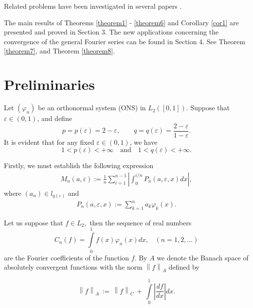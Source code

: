 \documentclass{publmathdeb}
\begin{document}
	Related problems have been investigated in several papers  
	\cite{Cagareishvili, GogoladzeTsagareishvili2, GogoladzeTsagareishvili13, GogoladzeTsagareishvili1, GogoladzeTsagareishvili, GogoladzeTsagareishvili3, PTT, PTW, PTW1, PSTW, tep1, tep2, tep4, Tsagareishvili01, Tsagareishvili2, Tsagareishvili4, Tsagareishvili5, tsatut1, tsatut3}.
	
	The main results of Theorems  \ref{theorem1} - \ref{theorem6} and Corollary \ref{cor1} are presented and proved in Section 3. The new applications concerning the convergence of the general Fourier series can be found in Section 4. See Theorem \ref{theorem7}, and Theorem \ref{theorem8}.
	
	
	
	\section{Preliminaries}
	\vspace{-6pt}
	
	Let \( (\varphi_n) \) be an orthonormal system (ONS) in \( L_2([0,1]) \). Suppose that \( \varepsilon \in (0,1) \), and define
	\[
	p = p(\varepsilon) = 2 - \varepsilon, \qquad q = q(\varepsilon) = \frac{2 - \varepsilon}{1 - \varepsilon}.
	\]
	It is evident that for any fixed \( \varepsilon \in (0,1) \), we have
	\[
	1 < p(\varepsilon) < +\infty \quad \text{and} \quad 1 < q(\varepsilon) < +\infty.
	\]
	
	Firstly, we must establish the following expression
	\begin{eqnarray}\label{eq1}
		M_n(a,\varepsilon) := \frac{1}{n} \sum_{i=1}^{n-1} \left|\int_{0}^{i/n} P_n( {a,\varepsilon, x})dx\right|,
	\end{eqnarray}
	where $(a_n)\in l_{q(\varepsilon)}$ and
	\begin{eqnarray} \label{eq2}
		P_n(a,\varepsilon, x) := \sum_{k=1}^{n}a_k \varphi_k(x).
	\end{eqnarray}
	
	Let us suppose that $f\in L_2,$  then the sequence of real numbers 
	\begin{equation} \label{eq*}
		{{C}_{n}}(f)=\int\limits_{0}^{1}{f(x){{\varphi }_{n}}(x)dx}, \ \ \ \ (n=1,2, \dots)
	\end{equation}
	are the Fourier coefficients of the function $f.$
	By $A$ we denote the Banach space of absolutely convergent functions with the norm  ${{\left\| f \right\|}_{A}}$ defined by
	
	\begin{equation} \label{*}
		{{\left\| f \right\|}_{A}}\,:=\,{{\left\| f \right\|}_{C}}\,+\,\int\limits_{0}^{1}{\left| \frac{df}{dx} \right|dx.}
	\end{equation}
	
\end{document}
